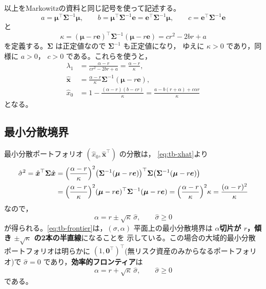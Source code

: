 以上をMarkowitzの資料と同じ記号を使って記述する。
\begin{equation}
a = \bm{\mu}^\top\bm{\Sigma}^{-1}\bm{\mu},\qquad
b = \bm{\mu}^\top\bm{\Sigma}^{-1}\bm{e} = \bm{e}^\top\bm{\Sigma}^{-1}\bm{\mu},\qquad
c = \bm{e}^\top\bm{\Sigma}^{-1}\bm{e}
\end{equation}
と
\begin{equation}
\kappa = (\bm{\mu}-r\bm{e})^\top\bm{\Sigma}^{-1}(\bm{\mu}-r\bm{e})
= cr^2 - 2br + a
\end{equation}
を定義する。$\bm{\Sigma}$ は正定値なので $\bm{\Sigma}^{-1}$ も正定値になり，
ゆえに $\kappa > 0$ であり，同様に $a>0$， $c>0$ である。これらを使うと，
\begin{align}
\lambda_1 &= \frac{\alpha - r}{cr^2 - 2br + a} = \frac{\alpha-r}{\kappa},\\
\hat{\bm{x}} &= \frac{\alpha-r}{\kappa}\bm{\Sigma}^{-1}(\bm{\mu}-r\bm{e}),
\label{eq:tb-xhat}\\
\hat x_0 &= 1 - \frac{(\alpha-r)(b-cr)}{\kappa}
= \frac{a - b(r+\alpha) + c\alpha r}{\kappa}
\label{eq:tb-x0hat}
\end{align}
となる。

\subsection{最小分散境界}

最小分散ポートフォリオ $(\hat x_0,\hat{\bm{x}}^\top)$ の分散は，
\eqref{eq:tb-xhat}より
\begin{align}
\hat\sigma^2 = \hat{\bm{x}}^\top\bm{\Sigma}\hat{\bm{x}}
&= \Bigl(\frac{\alpha-r}{\kappa}\Bigr)^2
\bigl(\bm{\Sigma}^{-1}(\bm{\mu}-r\bm{e})\bigr)^\top\bm{\Sigma}
\bigl(\bm{\Sigma}^{-1}(\bm{\mu}-r\bm{e})\bigr)\notag\\
&= \Bigl(\frac{\alpha-r}{\kappa}\Bigr)^2
(\bm{\mu}-r\bm{e})^\top\bm{\Sigma}^{-1}(\bm{\mu}-r\bm{e})
= \Bigl(\frac{\alpha-r}{\kappa}\Bigr)^2 \kappa
= \frac{(\alpha-r)^2}{\kappa}
\end{align}
なので，
\begin{equation}
\alpha = r \pm \sqrt{\kappa}\,\hat\sigma,\qquad \hat\sigma \geq 0
\label{eq:tb-frontier}
\end{equation}
が得られる。\eqref{eq:tb-frontier}は，$(\sigma,\alpha)$ 平面上の最小分散境界は
\textbf{$\alpha$切片が $r$，傾き $\pm\sqrt{\kappa}$ の2本の半直線}になることを
示している。この場合の大域的最小分散ポートフォリオは明らかに
$(1,\bm{0}^\top)^\top$(無リスク資産のみからなるポートフォリオ)で
$\hat\sigma=0$ であり，\textbf{効率的フロンティア}は
\begin{equation}
\alpha = r + \sqrt{\kappa}\,\hat\sigma,\qquad \hat\sigma\geq 0
\label{eq:tb-eff-frontier}
\end{equation}
である。

